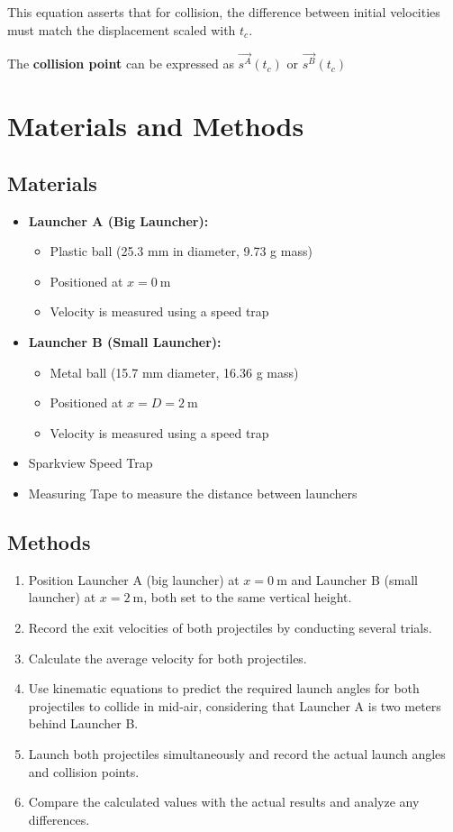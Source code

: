 \documentclass[12pt]{article}
\begin{document}
This equation asserts that for collision, the difference between initial velocities must match the displacement scaled with $t_c$. 

The \textbf{collision point} can be expressed as \(\vec{s^A}(t_c)\) or \(\vec{s^B}(t_c)\)

\section{Materials and Methods}

\subsection{Materials}
\begin{itemize}
    \item \textbf{Launcher A (Big Launcher):}
    \begin{itemize}
        \item Plastic ball (25.3 mm in diameter, 9.73 g mass)
        \item Positioned at $x = 0 \ \text{m}$
        \item Velocity is measured using a speed trap
    \end{itemize}
    \item \textbf{Launcher B (Small Launcher):}
    \begin{itemize}
        \item Metal ball (15.7 mm diameter, 16.36 g mass)
        \item Positioned at $x = D = 2 \ \text{m}$
        \item Velocity is measured using a speed trap
    \end{itemize}
    \item Sparkview Speed Trap
    \item Measuring Tape to measure the distance between launchers
\end{itemize}

\subsection{Methods}
\begin{enumerate}
    \item Position Launcher A (big launcher) at $x = 0 \ \text{m}$ and Launcher B (small launcher) at $x = 2 \ \text{m}$, both set to the same vertical height.
    \item Record the exit velocities of both projectiles by conducting several trials.
    \item Calculate the average velocity for both projectiles.
    \item Use kinematic equations to predict the required launch angles for both projectiles to collide in mid-air, considering that Launcher A is two meters behind Launcher B.
    \item Launch both projectiles simultaneously and record the actual launch angles and collision points.
    \item Compare the calculated values with the actual results and analyze any differences.
\end{enumerate}
\end{document}

